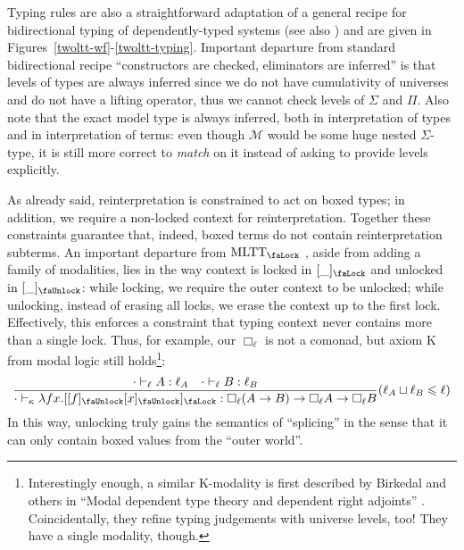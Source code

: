 Typing rules are also a straightforward adaptation of a
general recipe for bidirectional typing of
dependently-typed systems \cite{Thiago2025} (see also
\cite{dunfield2021bidirectional,coquand1996algorithm})
and are given in
Figures~\ref{twoltt-wf}-\ref{twoltt-typing}.
Important departure from standard bidirectional
recipe ``constructors are checked, eliminators are
inferred'' is that levels of types are always inferred
since we do not have cumulativity of universes and do
not have a lifting operator, thus we cannot check
levels of $\Sigma$ and $\Pi$. Also note that the exact
model type is always inferred, both in interpretation
of types and in interpretation of terms: even though
$\mathcal{M}$ would be some huge nested $\Sigma$-type,
it is still more correct to \textit{match} on it
instead of asking to provide levels explicitly.

As already said, reinterpretation is constrained to act
on boxed types; in addition, we require a non-locked
context for reinterpretation. Together these
constraints guarantee that, indeed, boxed terms do not
contain reinterpretation subterms. An important
departure from $\mathrm{MLTT}_\text{\faLock}$
\cite{Gratzer2019}, aside from adding a family of
modalities, lies in the way context is locked in
$[\_]_\text{\faLock}$ and unlocked in
$[\_]_\text{\faUnlock}$: while locking, we require the
outer context to be unlocked; while unlocking, instead
of erasing all locks, we erase the context up to the
first lock. Effectively, this enforces a constraint
that typing context never contains more than a single
lock. Thus, for example, our $\Box_\ell$ is not a
comonad, but axiom K from modal logic still
holds\footnote{Interestingly enough, a similar
K-modality is first described by Birkedal and others in
``Modal dependent type theory and dependent right
adjoints'' \cite{Birkedal2020}. Coincidentally, they
refine typing judgements with universe levels, too!
They have a single modality, though.}:
\[
    \dfrac{\cdot\vdash_\ell A:\ell_A
    \quad\cdot\vdash_\ell B:\ell_B}{
        \cdot\vdash_\kappa\lambda f x.[[f
        ]_\text{\faUnlock}[x]_\text{\faUnlock}
        ]_\text{\faLock}:\Box_\ell(A\to B)\to
            \Box_\ell A\to\Box_\ell B
    }(\ell_A\sqcup\ell_B\leqslant\ell)
\]
In this way, unlocking truly gains the semantics of
``splicing'' in the sense that it can only contain
boxed values from the ``outer world''.

